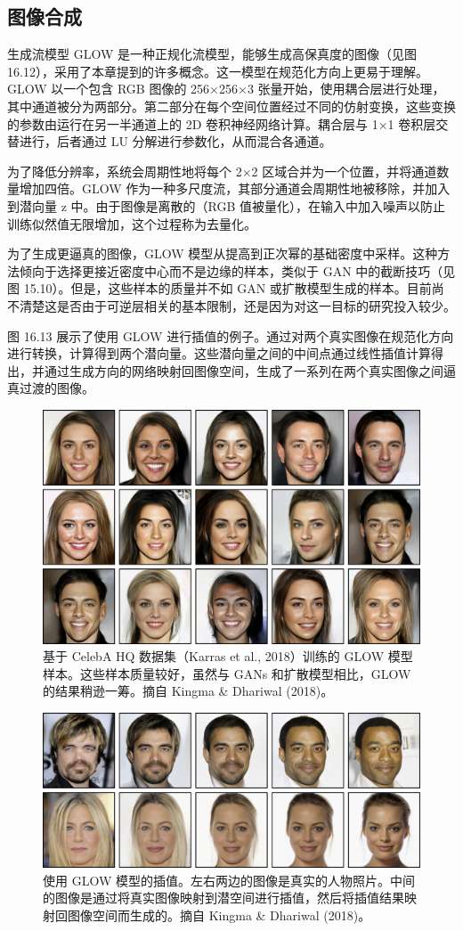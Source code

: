\subsection{图像合成}
生成流模型 GLOW 是一种正规化流模型，能够生成高保真度的图像（见图 16.12），采用了本章提到的许多概念。这一模型在规范化方向上更易于理解。GLOW 以一个包含 RGB 图像的 256×256×3 张量开始，使用耦合层进行处理，其中通道被分为两部分。第二部分在每个空间位置经过不同的仿射变换，这些变换的参数由运行在另一半通道上的 2D 卷积神经网络计算。耦合层与 1×1 卷积层交替进行，后者通过 LU 分解进行参数化，从而混合各通道。

为了降低分辨率，系统会周期性地将每个 2×2 区域合并为一个位置，并将通道数量增加四倍。GLOW 作为一种多尺度流，其部分通道会周期性地被移除，并加入到潜向量 z 中。由于图像是离散的（RGB 值被量化），在输入中加入噪声以防止训练似然值无限增加，这个过程称为去量化。

为了生成更逼真的图像，GLOW 模型从提高到正次幂的基础密度中采样。这种方法倾向于选择更接近密度中心而不是边缘的样本，类似于 GAN 中的截断技巧（见图 15.10）。但是，这些样本的质量并不如 GAN 或扩散模型生成的样本。目前尚不清楚这是否由于可逆层相关的基本限制，还是因为对这一目标的研究投入较少。

图 16.13 展示了使用 GLOW 进行插值的例子。通过对两个真实图像在规范化方向进行转换，计算得到两个潜向量。这些潜向量之间的中间点通过线性插值计算得出，并通过生成方向的网络映射回图像空间，生成了一系列在两个真实图像之间逼真过渡的图像。

\begin{figure}[ht!]
\centering
\includegraphics[width=0.7\linewidth]{png/chapter16/FlowGLOWSamples.png}
\caption{基于 CelebA HQ 数据集（Karras et al., 2018）训练的 GLOW 模型样本。这些样本质量较好，虽然与 GANs 和扩散模型相比，GLOW 的结果稍逊一筹。摘自 Kingma \& Dhariwal (2018)。}
\end{figure}


\begin{figure}[ht!]
\centering
\includegraphics[width=0.7\linewidth]{png/chapter16/FlowGLOWInterp.png}
\caption{使用 GLOW 模型的插值。左右两边的图像是真实的人物照片。中间的图像是通过将真实图像映射到潜空间进行插值，然后将插值结果映射回图像空间而生成的。摘自 Kingma \& Dhariwal (2018)。}
\end{figure}


